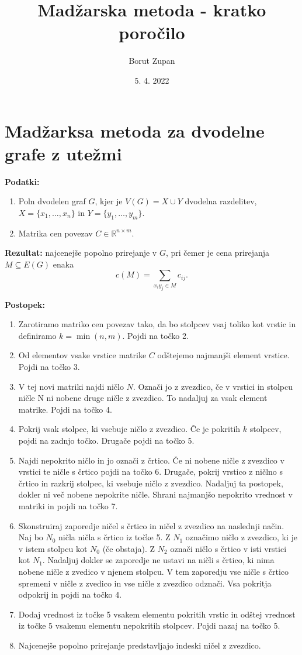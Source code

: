 \documentclass[a4paper, 12pt]{article}
\title{Madžarska metoda - kratko poročilo}
\author{Borut Zupan}
\date{5. 4. 2022}
\begin{document}
\maketitle

\section{Madžarksa metoda za dvodelne grafe z utežmi}
\textbf{Podatki:}
\begin{enumerate}
    \item Poln dvodelen graf $G$, kjer je $V(G) = X \cup Y$ dvodelna razdelitev, $X = \{x_1,\ldots,x_n\}$
            in $Y = \{y_1,\ldots,y_m\}$.
    \item Matrika cen povezav $C \in \mathbb{R}^{n\times m}$.
\end{enumerate}
\textbf{Rezultat:}
najcenejše popolno prirejanje v $G$, pri čemer je cena prirejanja $M \subseteq E(G)$ enaka
$$ c(M) = \sum_{x_iy_j \in M}c_{ij}. $$

\textbf{Postopek:}
\begin{enumerate}
    \item Zarotiramo matriko cen povezav tako, da bo stolpcev vsaj toliko kot vrstic in 
            definiramo $k = \min{(n,m)}$. Pojdi na točko 2.
    \item Od elementov vsake vrstice matrike $C$ odštejemo najmanjši element vrstice. Pojdi
            na točko 3.
    \item V tej novi matriki najdi ničlo $N$. Označi jo z zvezdico, če v vrstici in stolpcu ničle
            N ni nobene druge ničle z zvezdico. To nadaljuj za vsak element matrike. Pojdi na točko 4.
    \item Pokrij vsak stolpec, ki vsebuje ničlo z zvezdico. Če je pokritih $k$ stolpcev, pojdi na 
            zadnjo točko. Drugače pojdi na točko 5.
    \item Najdi nepokrito ničlo in jo označi z črtico. Če ni nobene ničle z zvezdico v vrstici te
            ničle s črtico pojdi na točko 6. Drugače, pokrij vrstico z ničlno s črtico in razkrij
            stolpec, ki vsebuje ničlo z zvezdico. Nadaljuj ta postopek, dokler ni več nobene nepokrite
            ničle. Shrani najmanjšo nepokrito vrednost v matriki in pojdi na točko 7.
    \item Skonstruiraj zaporedje ničel s črtico in ničel z zvezdico na naslednji način. Naj bo $N_0$ ničla
            ničla s črtico iz točke 5. Z $N_1$ označimo ničlo z zvezdico, ki je v istem stolpcu kot $N_0$ (če obstaja).
            Z $N_2$ označi ničlo s črtico v isti vrstici kot $N_1$. Nadaljuj dokler se zaporedje ne ustavi
            na ničli s črtico, ki nima nobene ničle z zvedico v njenem stolpcu. V tem zaporedju vse ničle s
            črtico spremeni v ničle z zvedico in vse ničle z zvezdico odznači. Vsa pokritja odpokrij in pojdi
            na točko 4.
    \item Dodaj vrednost iz točke 5 vsakem elementu pokritih vrstic in odštej vrednost iz točke 5 vsakemu
            elementu nepokritih stolpcev. Pojdi nazaj na točko 5.
    \item Najcenejše popolno prirejanje predstavljajo indeski ničel z zvezdico.
\end{enumerate}
\end{document}
